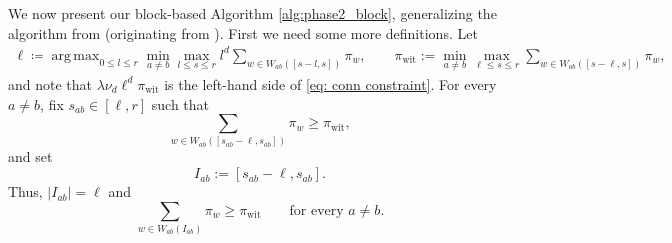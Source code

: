 \documentclass[11pt, a4paper]{amsart}
\newcommand{\1}{\mathbf{1}}
\theoremstyle{definition}
\theoremstyle{remark}
\theoremstyle{definition}
\DeclareMathOperator*{\argmax}{arg\,max}
\begin{document}
We now present our block-based Algorithm \ref{alg:phase2_block}, generalizing the algorithm from \cite{gaudio2026jan} (originating from \cite{gaudio2024exactcommunityrecoverygeometric}). First we need some more definitions. Let
\begin{align}
    \ell \coloneqq \argmax_{0 \le l \le r }\min_{a \neq b}\max_{l\le s\le r} 
l^d \sum_{w \in W_{ab}([s-l,s])} \pi_w,\qquad \pi_{\mathrm{wit}}:=\min_{a \neq b}\max_{\ell\le s \le r} 
\sum_{w \in W_{ab}([s-\ell,s])} \pi_w,\label{def:ell}
\end{align}
and note that $\lambda \nu_d \ell^d \pi_{\mathrm{wit}}$ is the left-hand side of \eqref{eq: conn constraint}. For every $a\neq b$, fix $s_{ab}\in[\ell,r]$ such that
\[
\sum_{w\in W_{ab}([s_{ab}-\ell,s_{ab}])}\pi_w
\geq \pi_{\mathrm{wit}},
\]
and set
\[
I_{ab}:=[s_{ab}-\ell,s_{ab}].
\]
Thus, $|I_{ab}|=\ell$ and
\[
\sum_{w\in W_{ab}(I_{ab})}\pi_w
\geq \pi_{\mathrm{wit}}
\qquad\text{for every }a\neq b.
\]
\end{document}
